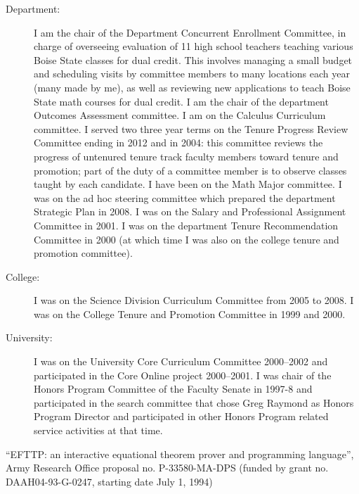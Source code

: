 \begin{description}
\begin{description}
\begin{description}
\item[Department:]  I am the chair of the Department Concurrent Enrollment Committee, in charge of overseeing evaluation of 11 high school teachers teaching various Boise State classes for dual credit.  This involves managing a small budget
and scheduling visits by committee members to many locations each year (many made by me), as well as reviewing new applications to teach Boise State math courses for dual credit.  I am the chair of the department Outcomes Assessment committee.  I am on the Calculus Curriculum committee.  I served two three year terms on the Tenure Progress Review Committee ending in 2012 and in 2004:  this committee reviews the progress of untenured tenure track faculty members toward tenure and promotion; part of the duty of a committee member is to observe classes taught by each candidate.  I have been on the Math Major committee.  I was on the ad hoc steering committee which prepared the department Strategic Plan in 2008.
I was on the Salary and Professional Assignment Committee in 2001.  I was on the department Tenure Recommendation Committee in 2000 (at which time I was also on the college tenure and promotion committee).

\item[College:]  I was on the Science Division Curriculum Committee from 2005 to 2008.  I was on the College Tenure and Promotion Committee in 1999 and 2000. 

\item[University:]   I was on the University Core Curriculum Committee 2000--2002 and participated in the Core Online project 2000--2001.  I was chair of the Honors Program Committee of the Faculty Senate in 1997-8 and participated in the search committee that chose Greg Raymond as Honors Program Director and participated in other Honors Program related service activities at that time.


\end{description}


\end{description}

\newpage

\item[Research Grants]
\begin{description}
\item
\item[1.] ``EFTTP: an interactive equational theorem prover and programming
language'', Army Research Office proposal no.  P-33580-MA-DPS (funded
by grant no.  DAAH04-93-G-0247, starting date July 1, 1994)


\end{description}
\end{description}

